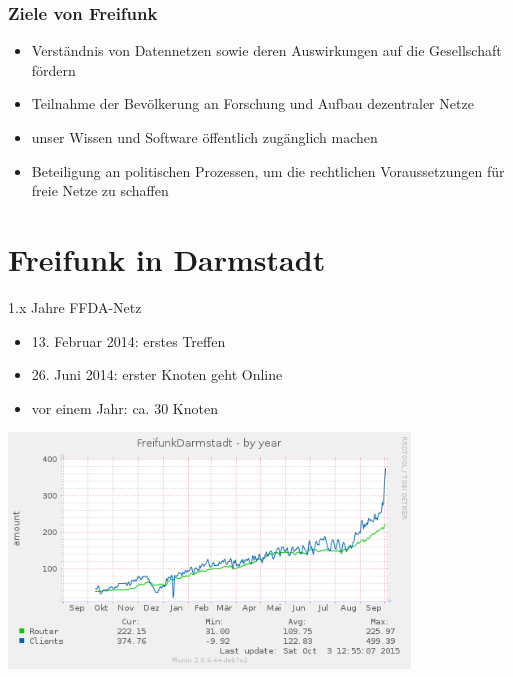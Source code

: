 \documentclass[10pt,handout]{beamer}
\begin{document}
\begin{frame}
	\frametitle{Ziele von Freifunk}
	\begin{itemize}[<+->]
		\item Verständnis von Datennetzen sowie deren Auswirkungen auf die Gesellschaft fördern
		\item Teilnahme der Bevölkerung an Forschung und Aufbau dezentraler Netze
		\item unser Wissen und Software öffentlich zugänglich machen
		\item Beteiligung an politischen Prozessen, um die rechtlichen Voraussetzungen für freie Netze zu schaffen
	\end{itemize}
\end{frame}


\section{Freifunk in Darmstadt}



\begin{frame}{1.x Jahre FFDA-Netz}
	\vfill
	\begin{itemize}[<+->]
		\item 13. Februar 2014: erstes Treffen
		\item 26. Juni 2014: erster Knoten geht Online
		\item vor einem Jahr: ca. 30 Knoten
	\end{itemize}
	\pause
	\begin{center}
		\includegraphics[width=0.8\textwidth]{images/ffda-Okt14-15}
	\end{center}
\end{frame}
\end{document}
